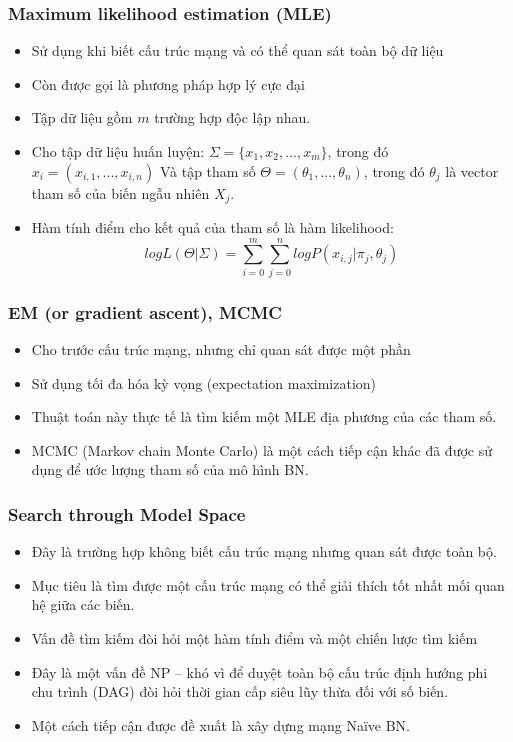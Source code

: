 \documentclass[12pt]{report}
\begin{document}
\subsubsection{Maximum likelihood estimation (MLE)}
\begin{itemize}
\item Sử dụng khi biết cấu trúc mạng và có thể quan sát toàn bộ dữ liệu
\item Còn được gọi là phương pháp hợp lý cực đại
\item Tập dữ liệu gồm $m$ trường hợp độc lập nhau.
\item Cho tập dữ liệu huấn luyện: $\Sigma = \{x_1, x_2, ..., x_m\}$, trong đó $x_i = (x_{i,1}, ..., x_{i,n})$
Và tập tham số $\Theta = (\theta_1, ..., \theta_n)$, trong đó $\theta_j$ là vector tham số của biến ngẫu nhiên $X_j$.
\item Hàm tính điểm cho kết quả của tham số là hàm likelihood:
$$log L(\Theta|\Sigma) = \sum_{i = 0} ^ m \sum_{j = 0} ^ n log P(x_{i,j} | \pi_j, \theta_j)$$
\end{itemize}

\subsubsection{EM (or gradient ascent), MCMC}
\begin{itemize}
\item Cho trước cấu trúc mạng, nhưng chỉ quan sát được một phần
\item Sử dụng tối đa hóa kỳ vọng (expectation maximization)
\item Thuật toán này thực tế là tìm kiếm một MLE địa phương của các tham số.
\item MCMC (Markov chain Monte Carlo) là một cách tiếp cận khác đã được sử dụng để ước lượng tham số của mô hình BN. 
\end{itemize}

\subsubsection{Search through Model Space}
\begin{itemize}
\item Đây là trường hợp không biết cấu trúc mạng nhưng quan sát được toàn bộ.
\item Mục tiêu là tìm được một cấu trúc mạng có thể giải thích tốt nhất mối quan hệ giữa các biến.
\item Vấn đề tìm kiếm đòi hỏi một hàm tính điểm và một chiến lược tìm kiếm
\item Đây là một vấn đề NP – khó vì để duyệt toàn bộ cấu trúc định hướng phi chu trình (DAG) đòi hỏi thời gian cấp siêu lũy thừa đối với số biến.
\item Một cách tiếp cận được đề xuất là xây dựng mạng Naïve BN.
\end{itemize}
\end{document}
